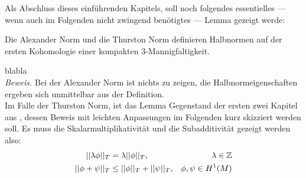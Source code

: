         Als Abschluss dieses einführenden Kapitels, soll noch folgendes essentielles --- wenn auch im Folgenden nicht zwingend benötigtes --- Lemma gezeigt werde:
        \begin{lem}
        \label{lem:norm}
        	Die Alexander Norm und die Thurston Norm definieren Halbnormen auf der ersten Kohomologie einer kompakten 3-Mannigfaltigkeit. 
        \end{lem}
        \newpage blabla\\
          \noindent\textit{Beweis.}
            Bei der Alexander Norm ist nichts zu zeigen, die Halbnormeigenschaften ergeben sich unmittelbar aus der Definition.\\
            Im Falle der Thurston Norm, ist das Lemma Gegenstand der ersten zwei Kapitel aus \cite{Thurston1986}, dessen Beweis mit leichten Anpassungen im Folgenden kurz skizziert werden soll.
            Es muss die Skalarmultiplikativität und die Subadditivität gezeigt werden also:
            \begin{align}
                ||\lambda\phi||_T & = \lambda ||\phi||_T ,&\lambda \in\mathbb{Z} \label{eq:scalarmul} \\
                ||\phi + \psi||_T &\leq ||\phi||_T + ||\psi||_T ,& \phi,\psi \in H^1(M) \label{eq:subadd}
            \end{align} 


